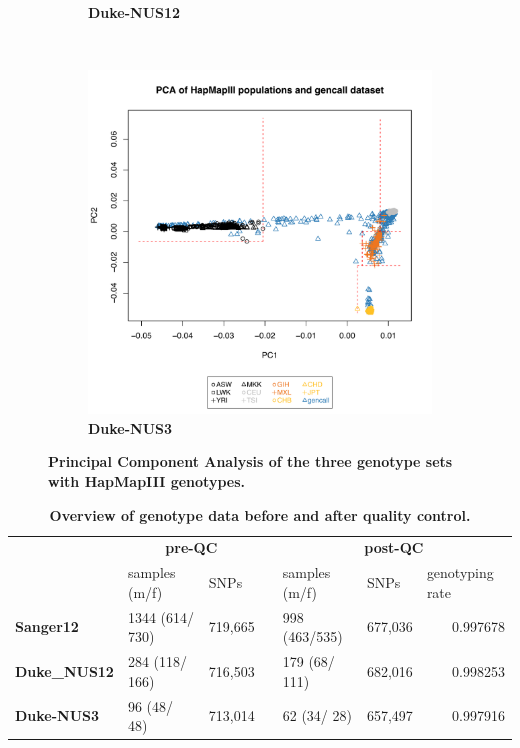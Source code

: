 \begin{figure}[!tbp]
\begin{subfigure}[b]{0.3\textwidth}
		\caption{\textbf{Duke-NUS12}}
		\label{fig:pca1}	
	\end{subfigure}
	~
	\begin{subfigure}[b]{0.3\textwidth}
		\center
		\includegraphics[trim = 0mm 0mm 10mm 25mm, clip,scale=0.3, page=3]{FiguresTablesGenotypes/pca_overview_sanger12_singapore123.pdf}	
		\caption{\textbf{Duke-NUS3}}
		\label{fig:pca1}	
	\end{subfigure}
  \caption{\textbf{Principal Component Analysis of the three genotype sets with HapMapIII genotypes.} }
   	\label{fig:pca}
\end{figure}




\begin{table}[htbp]
  \centering
  \caption{\textbf{Overview of genotype data before and after quality control.}}
    \begin{tabular}{llrllrr}
    		\toprule
          & \multicolumn{2}{c}{\textbf{pre-QC}} &  &\multicolumn{3}{c}{\textbf{post-QC}} \\
          \cmidrule{2-3}\cmidrule{5-7}
          & samples (m/f) & \multicolumn{1}{l}{SNPs} & & samples (m/f) & \multicolumn{1}{l}{SNPs} & \multicolumn{1}{l}{genotyping rate} \\
            \cmidrule{2-7}
    \textbf{Sanger12} & 1344  (614/  730) & 719,665 & & 998 (463/535) & 677,036 & 0.997678 \\
    \textbf{Duke\_NUS12} & 284 (118/ 166) & 716,503 &  &179 (68/ 111) & 682,016 & 0.998253 \\
    \textbf{Duke-NUS3} & 96 (48/ 48) & 713,014 &  &62 (34/ 28) & 657,497 & 0.997916 \\
    \bottomrule
    \end{tabular}%
  \label{tab:genoOverview}%
\end{table}%


